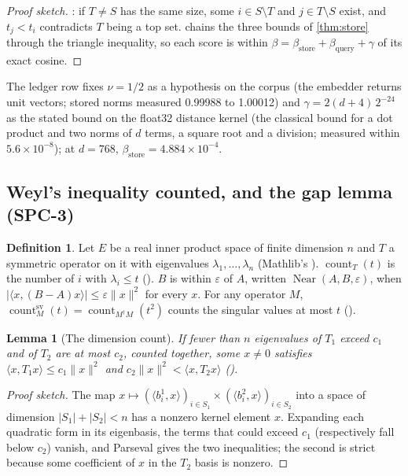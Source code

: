 \documentclass[11pt]{article}
\theoremstyle{plain}
\newtheorem{lemma}[theorem]{Lemma}
\theoremstyle{definition}
\newtheorem{definition}[theorem]{Definition}
\theoremstyle{remark}
\newcommand{\norm}[1]{\lVert #1 \rVert}
\newcommand{\abs}[1]{\lvert #1 \rvert}
\newcommand{\inner}[2]{\langle #1, #2 \rangle}
\newcommand{\cnt}{\operatorname{count}}
\newcommand{\countSV}{\operatorname{count}^{\mathrm{sv}}}
\newcommand{\betaS}{\beta_{\mathrm{store}}}
\newcommand{\betaQ}{\beta_{\mathrm{query}}}
\begin{document}
\begin{proof}[Proof sketch]
: if $T \ne S$ has the same size, some $i \in S \setminus T$ and $j \in T
\setminus S$ exist, and $t_j < t_i$ contradicts $T$ being a top set.  chains the
three bounds of \cref{thm:store} through the triangle inequality, so each score is within
$\beta = \betaS + \betaQ + \gamma$ of its exact cosine.
\end{proof}

The ledger row fixes $\nu = 1/2$ as a hypothesis on the corpus (the embedder returns unit vectors;
stored norms measured 0.99988 to 1.00012) and $\gamma = 2(d + 4)\,2^{-24}$ as the stated bound on
the float32 distance kernel (the classical bound for a dot product and two norms of $d$ terms, a
square root and a division; measured within $5.6\times 10^{-8}$); at $d = 768$,
$\betaS = 4.884\times 10^{-4}$.

\subsection{Weyl's inequality counted, and the gap lemma (SPC-3)}

\begin{definition}
Let $E$ be a real inner product space of finite dimension $n$ and $T$ a symmetric operator on
it with eigenvalues $\lambda_1, \dots, \lambda_n$ (Mathlib's ).
$\cnt_T(t)$ is the number of $i$ with $\lambda_i \le t$ (). $B$ is
within $\varepsilon$ of $A$, written $\operatorname{Near}(A, B, \varepsilon)$, when
$\abs{\inner{x}{(B - A)x}} \le \varepsilon\norm{x}^2$ for every $x$. For any operator $M$,
$\countSV_M(t) = \cnt_{M^\dagger M}(t^2)$ counts the singular values at most $t$
().
\end{definition}

\begin{lemma}[The dimension count]\label{lem:dim}
If fewer than $n$ eigenvalues of $T_1$ exceed $c_1$ and of $T_2$ are at most $c_2$, counted
together, some $x \ne 0$ satisfies $\inner{x}{T_1 x} \le c_1\norm{x}^2$ and
$c_2\norm{x}^2 < \inner{x}{T_2 x}$ ().
\end{lemma}

\begin{proof}[Proof sketch]
The map $x \mapsto (\inner{b^1_i}{x})_{i \in S_1} \times (\inner{b^2_i}{x})_{i \in S_2}$ into a
space of dimension $\abs{S_1} + \abs{S_2} < n$ has a nonzero kernel element $x$. Expanding each
quadratic form in its eigenbasis, the terms that could exceed $c_1$ (respectively fall below
$c_2$) vanish, and Parseval gives the two inequalities; the second is strict because some
coefficient of $x$ in the $T_2$ basis is nonzero.
\end{proof}
\end{document}
